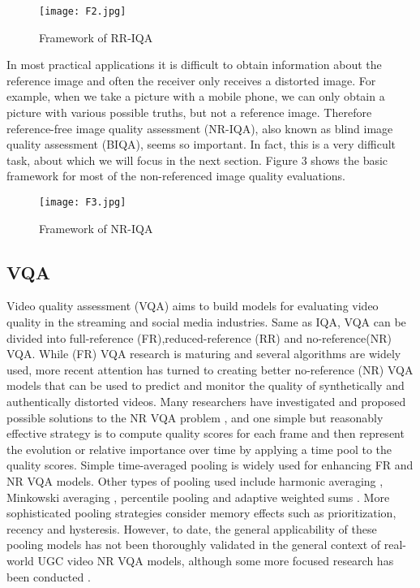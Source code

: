 \documentclass{article}
\begin{document}
\begin{figure}[htbp]
    \centering
    \texttt{[image: F2.jpg]}
    \caption{Framework of RR-IQA}
    \label{2}
\end{figure} 

In most practical applications it is difficult to obtain information about the reference image and often the receiver only receives a distorted image. For example, when we take a picture with a mobile phone, we can only obtain a picture with various possible truths, but not a reference image. Therefore reference-free image quality assessment (NR-IQA), also known as blind image quality assessment (BIQA), seems so important. In fact, this is a very difficult task, about which we will focus in the next section. Figure 3 shows the basic framework for most of the non-referenced image quality evaluations.

\begin{figure}[htbp]
    \centering
    \texttt{[image: F3.jpg]}
    \caption{Framework of NR-IQA}
    \label{3}
\end{figure} 

\subsection{VQA}
\label{VQA}
Video quality assessment (VQA) aims to build models for evaluating video quality in the streaming and social media industries. Same as IQA, VQA can be divided into full-reference (FR),reduced-reference (RR) and no-reference(NR) VQA. While (FR) VQA research is maturing and several algorithms\cite{wang2004image,li2016toward} are widely used, more recent attention has turned to creating better no-reference (NR) VQA models that can be used to predict and monitor the quality of synthetically and authentically distorted  videos. Many researchers have investigated and proposed possible solutions to the NR VQA problem \cite{mittal2012no,saad2014blind,xu2014no,mittal2015completely,ghadiyaram2017perceptual,varga2019no,li2019quality}, and one simple but reasonably effective strategy is to compute quality scores for each frame and then represent the evolution or relative importance over time by applying a time pool to the quality scores. Simple time-averaged pooling is widely used for enhancing FR \cite{seshadrinathan2009motion,bampis2017speed,vu2014vis3} and NR VQA models\cite{saad2014blind,mittal2015completely,varga2019no}. Other types of pooling used include harmonic averaging \cite{li2018vmaf}, Minkowski averaging \cite{rimac2009influence,seufert2013pool}, percentile pooling \cite{moorthy2009visual,chen2016perceptual} and adaptive weighted sums \cite{park2012video}. More sophisticated pooling strategies consider memory effects such as prioritization, recency \cite{rimac2009influence,seufert2013pool,bampis2017study} and hysteresis\cite{xu2014no,li2019quality,seshadrinathan2011temporal,choi2018video}. However, to date, the general applicability of these pooling models has not been thoroughly validated in the general context of real-world UGC video NR VQA models, although some more focused research has been conducted \cite{rimac2009influence,seufert2013pool}.
\end{document}
